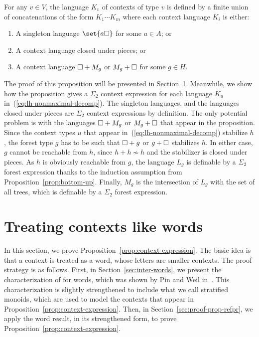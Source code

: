 \documentclass{LMCS}
\begin{document}
\begin{prop}\label{prop:context-expression}
  For any $v \in V$, the language $K_v$ of contexts of type $v$ is
  defined by a finite union of concatenations of the form $K_{1} \cdots
  K_{m}$ where each context language $K_{i}$ is either:
  \begin{enumerate}[\em(1)]
  \item A singleton language $\set{a \hole}$ for some $a \in A$; or
\item A context language closed under pieces; or
\item  A  context  language    $\Box + M_g$
  or $M_g + \Box$ for  some $g \in H$.
  \end{enumerate}
\end{prop}


The proof of this proposition will be presented in
Section~\ref{sec:treat-cont-like-words}. Meanwhile, we show how the
proposition gives a $\Sigma_2$ context expression for each language $K_u$
in~(\ref{eq:lh-nonmaximal-decomp}). The singleton languages, and the
languages closed under pieces are $\Sigma_2$ context expressions by
definition.  The only potential problem is with the languages $\Box +
M_g$ or $M_g + \Box$ that appear in the proposition.  Since the
context types $u$ that appear in~(\ref{eq:lh-nonmaximal-decomp})
stabilize $h$, the forest type $g$ has to be such that $\Box + g$ or
$g + \Box$ stabilizes $h$. In either case, $g$ cannot be reachable
from $h$, since $h + h \not \sim h$ and the stabilizer is closed under
pieces. As $h$ is obviously reachable from $g$, the language $L_g$ is
definable by a $\Sigma_2$ forest expression thanks to the induction
assumption from Proposition~\ref{prop:bottom-up}. Finally, $M_g$ is
the intersection of $L_g$ with the set of all trees, which is
definable by a $\Sigma_2$ forest expression.


\section{Treating contexts like words}
\label{sec:treat-cont-like-words}
In this section, we prove Proposition~\ref{prop:context-expression}.
The basic idea is that a context is treated as a word, whose letters are smaller contexts.
The proof strategy is as follows. First, in Section~\ref{sec:inter-words}, we
present the characterization of \Dtwo for words, which was shown by Pin and
Weil in~\cite{weilpinpoly}. This characterization is slightly strengthened to
include what we call stratified monoids, which are used to model the contexts
that appear in Proposition~\ref{prop:context-expression}.  Then, in
Section~\ref{sec:proof-prop-refpr}, we apply the word result, in its
strengthened form, to prove Proposition~\ref{prop:context-expression}.
\end{document}
